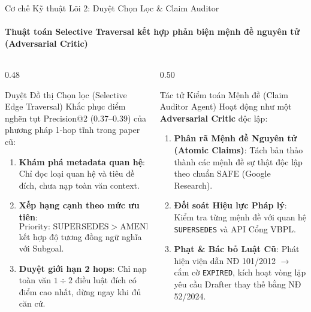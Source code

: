 \documentclass[aspectratio=169,10pt,xcolor={table}]{beamer}
\begin{document}
\begin{frame}{Cơ chế Kỹ thuật Lõi 2: Duyệt Chọn Lọc \& Claim Auditor}
\framesubtitle{Thuật toán Selective Traversal kết hợp phản biện mệnh đề nguyên tử (Adversarial Critic)}
\begin{columns}[T]
\begin{column}{0.48\textwidth}
\begin{block}{\small Duyệt Đồ thị Chọn lọc (Selective Edge Traversal)}
\footnotesize
Khắc phục điểm nghẽn tụt Precision@2 (0.37--0.39) của phương pháp 1-hop tĩnh trong paper cũ:
\begin{enumerate}\scriptsize
  \item \textbf{Khám phá metadata quan hệ}: Chỉ đọc loại quan hệ và tiêu đề đích, chưa nạp toàn văn context.
  \item \textbf{Xếp hạng cạnh theo mức ưu tiên}:
    $$\text{Priority: } \text{SUPERSEDES} > \text{AMENDS} > \text{GUIDES}$$
    kết hợp độ tương đồng ngữ nghĩa với Subgoal.
  \item \textbf{Duyệt giới hạn 2 hops}: Chỉ nạp toàn văn $1\div 2$ điều luật đích có điểm cao nhất, dừng ngay khi đủ căn cứ.
\end{enumerate}
\end{block}
\end{column}

\begin{column}{0.50\textwidth}
\begin{block}{\small Tác tử Kiểm toán Mệnh đề (Claim Auditor Agent)}
\footnotesize
Hoạt động như một \textbf{Adversarial Critic} độc lập:
\begin{enumerate}\scriptsize
  \item \textbf{Phân rã Mệnh đề Nguyên tử (Atomic Claims)}:
    Tách bản thảo thành các mệnh đề sự thật độc lập theo chuẩn SAFE (Google Research).
  \item \textbf{Đối soát Hiệu lực Pháp lý}:
    Kiểm tra từng mệnh đề với quan hệ \texttt{SUPERSEDES} và API Cổng VBPL.
  \item \textbf{Phạt \& Bác bỏ Luật Cũ}:
    Phát hiện viện dẫn NĐ 101/2012 $\to$ cắm cờ \texttt{EXPIRED}, kích hoạt vòng lặp yêu cầu Drafter thay thế bằng NĐ 52/2024.
\end{enumerate}
\end{block}
\end{column}
\end{columns}
\end{frame}
\end{document}

